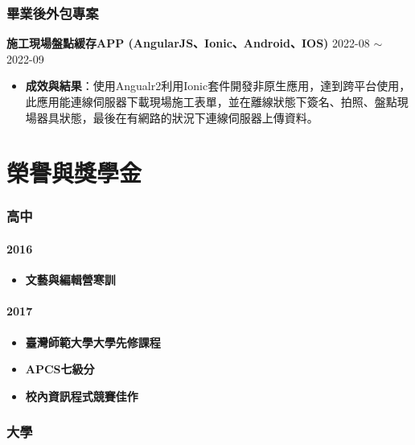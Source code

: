 \documentclass[classical]{einfart}
\begin{document}
\section{畢業後外包專案}

\textbf{施工現場盤點緩存APP (AngularJS、Ionic、Android、IOS)} \hfill 2022-08 $\sim$ 2022-09

\begin{itemize}[parsep=0.5ex]
\item \textbf{成效與結果}：使用Angualr2利用Ionic套件開發非原生應用，達到跨平台使用，此應用能連線伺服器下載現場施工表單，並在離線狀態下簽名、拍照、盤點現場器具狀態，最後在有網路的狀況下連線伺服器上傳資料。

\end{itemize}

\newpage

\part{榮譽與獎學金}

\section{高中}

\subsection{2016}

\begin{itemize}[parsep=0.5ex]
  \item \textbf{文藝與編輯營寒訓}
\end{itemize}

\subsection{2017}

\begin{itemize}[parsep=0.5ex]
  \item \textbf{臺灣師範大學大學先修課程}

  \item \textbf{APCS七級分}
  
  \item \textbf{校內資訊程式競賽佳作}
\end{itemize}

\section{大學}
\end{document}

